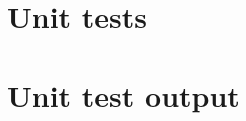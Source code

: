 \begin{scriptsize}
\begin{ttfamily}

\end{ttfamily}
\end{scriptsize}

\section{Unit tests}

\begin{scriptsize}
\begin{ttfamily}

\end{ttfamily}
\end{scriptsize}

\section{Unit test output}

\begin{scriptsize}
\begin{ttfamily}

\end{ttfamily}
\end{scriptsize}

